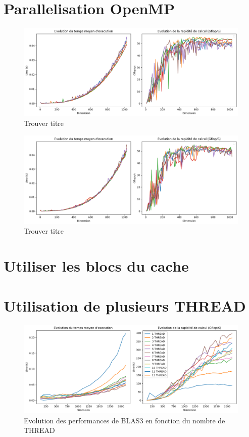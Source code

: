 \documentclass{report}
\begin{document}
\chapter{Parallelisation OpenMP}

\begin{figure}[H]
    \centering
    \includegraphics[width=0.7\linewidth]{images/fig4.png}
    \caption{Trouver titre}
    \label{fig:4}
\end{figure}

\begin{figure}[H]
    \centering
    \includegraphics[width=0.7\linewidth]{images/fig5.png}
    \caption{Trouver titre}
    \label{fig:5}
\end{figure}

\chapter{Utiliser les blocs du cache}

\chapter{Utilisation de plusieurs THREAD}

\begin{figure}[H]
    \centering
    \includegraphics[width=0.7\linewidth]{images/fig6.png}
    \caption{Evolution des performances de BLAS3 en fonction du nombre de THREAD}
    \label{fig:6}
\end{figure}
\end{document}

